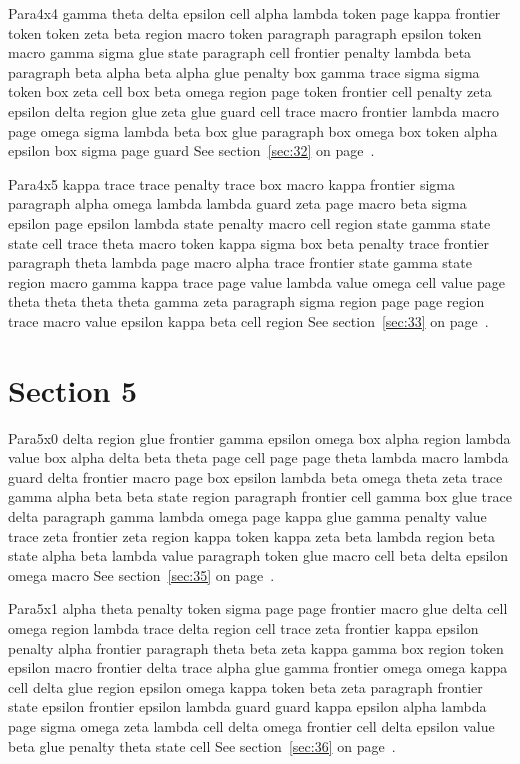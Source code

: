 \documentclass{article}
\begin{document}
Para4x4 gamma theta delta epsilon cell alpha lambda token page kappa frontier token token zeta beta region macro token paragraph paragraph epsilon token macro gamma sigma glue state paragraph cell frontier penalty lambda beta paragraph beta alpha beta alpha glue penalty box gamma trace sigma sigma token box zeta cell box beta omega region page token frontier cell penalty zeta epsilon delta region glue zeta glue guard cell trace macro frontier lambda macro page omega sigma lambda beta box glue paragraph box omega box token alpha epsilon box sigma page guard See section~\ref{sec:32} on page~\pageref{sec:16}.

Para4x5 kappa trace trace penalty trace box macro kappa frontier sigma paragraph alpha omega lambda lambda guard zeta page macro beta sigma epsilon page epsilon lambda state penalty macro cell region state gamma state state cell trace theta macro token kappa sigma box beta penalty trace frontier paragraph theta lambda page macro alpha trace frontier state gamma state region macro gamma kappa trace page value lambda value omega cell value page theta theta theta theta gamma zeta paragraph sigma region page page region trace macro value epsilon kappa beta cell region See section~\ref{sec:33} on page~\pageref{sec:17}.

\section{Section 5}\label{sec:5}
Para5x0 delta region glue frontier gamma epsilon omega box alpha region lambda value box alpha delta beta theta page cell page page theta lambda macro lambda guard delta frontier macro page box epsilon lambda beta omega theta zeta trace gamma alpha beta beta state region paragraph frontier cell gamma box glue trace delta paragraph gamma lambda omega page kappa glue gamma penalty value trace zeta frontier zeta region kappa token kappa zeta beta lambda region beta state alpha beta lambda value paragraph token glue macro cell beta delta epsilon omega macro See section~\ref{sec:35} on page~\pageref{sec:15}.

Para5x1 alpha theta penalty token sigma page page frontier macro glue delta cell omega region lambda trace delta region cell trace zeta frontier kappa epsilon penalty alpha frontier paragraph theta beta zeta kappa gamma box region token epsilon macro frontier delta trace alpha glue gamma frontier omega omega kappa cell delta glue region epsilon omega kappa token beta zeta paragraph frontier state epsilon frontier epsilon lambda guard guard kappa epsilon alpha lambda page sigma omega zeta lambda cell delta omega frontier cell delta epsilon value beta glue penalty theta state cell See section~\ref{sec:36} on page~\pageref{sec:16}.
\end{document}
